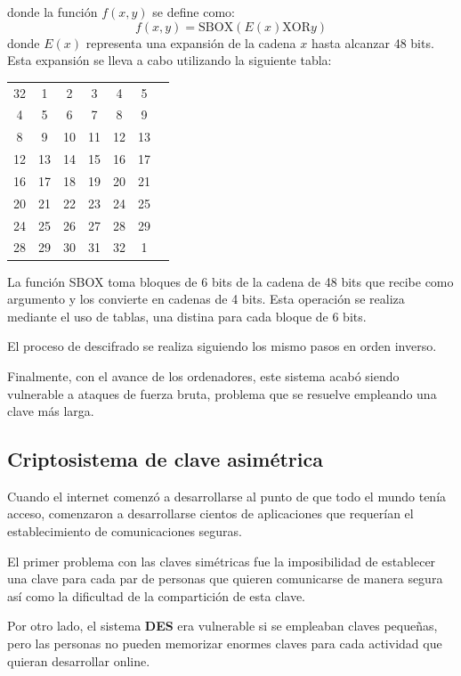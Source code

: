 \documentclass[nochap]{apuntesURJC}
\begin{document}
\begin{enumerate}
donde la función $f(x,y)$ se define como:
\[f(x,y) = \text{SBOX}(E(x) \text{XOR} y)\]
donde $E(x)$ representa una expansión de la cadena $x$ hasta alcanzar 48 bits. Esta expansión se lleva a cabo utilizando la siguiente tabla:
\begin{center}
\begin{tabular}{ccccccc}
32 &  1 &   2 &   3 &   4 &   5\\
4  & 5  &  6  &  7  &  8  &  9\\
8  & 9  & 10  & 11  & 12  & 13\\
12 & 13 &  14 &  15 &  16 &  17\\
16 & 17 &  18 &  19 &  20 &  21\\
20 & 21 &  22 &  23 &  24 &  25\\
24 & 25 &  26 &  27 &  28 &  29\\
28 & 29 &  30 &  31 &  32 &   1
\end{tabular}
\end{center}

La función SBOX toma bloques de 6 bits de la cadena de 48 bits que recibe como argumento y los convierte en cadenas de 4 bits. Esta operación se realiza mediante el uso de tablas, una distina para cada bloque de 6 bits.


\end{enumerate}

El proceso de descifrado se realiza siguiendo los mismo pasos en orden inverso.

Finalmente, con el avance de los ordenadores, este sistema acabó siendo vulnerable a ataques de fuerza bruta, problema que se resuelve empleando una clave más larga.

\subsection{Criptosistema de clave asimétrica}
Cuando el internet comenzó a desarrollarse al punto de que todo el mundo tenía acceso, comenzaron a desarrollarse cientos de aplicaciones que requerían el establecimiento de comunicaciones seguras.

El primer problema con las claves simétricas fue la imposibilidad de establecer una clave para cada par de personas que quieren comunicarse de manera segura así como la dificultad de la compartición de esta clave.

Por otro lado, el sistema \textbf{DES} era vulnerable si se empleaban claves pequeñas, pero las personas no pueden memorizar enormes claves para cada actividad que quieran desarrollar online.
\end{document}

